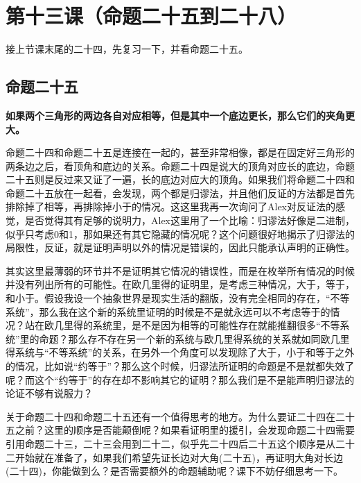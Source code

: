 \documentclass[
]{book}
\begin{document}
\hypertarget{ux7b2cux5341ux4e09ux8bfeux547dux9898ux4e8cux5341ux4e94ux5230ux4e8cux5341ux516b}{%
\chapter{第十三课（命题二十五到二十八）}\label{ux7b2cux5341ux4e09ux8bfeux547dux9898ux4e8cux5341ux4e94ux5230ux4e8cux5341ux516b}}

接上节课末尾的二十四，先复习一下，并看命题二十五。

\hypertarget{ux547dux9898ux4e8cux5341ux4e94}{%
\section{命题二十五}\label{ux547dux9898ux4e8cux5341ux4e94}}

\textbf{如果两个三角形的两边各自对应相等，但是其中一个底边更长，那么它们的夹角更大。}

命题二十四和命题二十五是连接在一起的，甚至非常相像，都是在固定好三角形的两条边之后，看顶角和底边的关系。命题二十四是说大的顶角对应长的底边，命题二十五则是反过来又证了一遍，长的底边对应大的顶角。如果我们将命题二十四和命题二十五放在一起看，会发现，两个都是归谬法，并且他们反证的方法都是首先排除掉了相等，再排除掉小于的情况。这这里我再一次询问了Alex对反证法的感觉，是否觉得其有足够的说明力，Alex这里用了一个比喻：归谬法好像是二进制，似乎只考虑0和1，那如果还有其它隐藏的情况呢？这个问题很好地揭示了归谬法的局限性，反证，就是证明声明以外的情况是错误的，因此只能承认声明的正确性。

其实这里最薄弱的环节并不是证明其它情况的错误性，而是在枚举所有情况的时候并没有列出所有的可能性。在欧几里得的证明里，是考虑三种情况，大于，等于，和小于。假设我设一个抽象世界是现实生活的翻版，没有完全相同的存在，``不等系统''，那么我在这个新的系统里证明的时候是不是就永远可以不考虑等于的情况？站在欧几里得的系统里，是不是因为相等的可能性存在就能推翻很多``不等系统''里的命题？那么存不存在另一个新的系统与欧几里得系统的关系就如同欧几里得系统与``不等系统''的关系，在另外一个角度可以发现除了大于，小于和等于之外的情况，比如说``约等于''？那么这个时候，归谬法所证明的命题是不是就都失效了呢？而这个``约等于''的存在却不影响其它的证明？那么我们是不是能声明归谬法的论证不够有说服力？

关于命题二十四和命题二十五还有一个值得思考的地方。为什么要证二十四在二十五之前？这里的顺序是否能颠倒呢？如果看证明里的援引，会发现命题二十四需要引用命题二十三，二十三会用到二十二，似乎先二十四后二十五这个顺序是从二十二开始就在准备了，如果我们希望先证长边对大角(二十五)，再证明大角对长边(二十四)，你能做到么？是否需要额外的命题辅助呢？课下不妨仔细思考一下。
\end{document}
